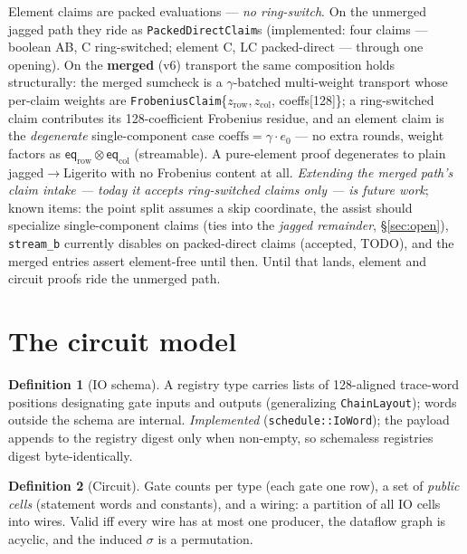 \documentclass[11pt]{article}
\newcommand{\eq}{\mathsf{eq}}
\newcommand{\code}[1]{\texttt{#1}}
\theoremstyle{definition}
\newtheorem{definition}{Definition}
\begin{document}
Element claims are packed evaluations --- \emph{no ring-switch}. On the
unmerged jagged path they ride as \code{PackedDirectClaim}s (implemented:
four claims --- boolean AB, C ring-switched; element C, LC packed-direct
--- through one opening). On the \textbf{merged} (v6) transport the same
composition holds structurally: the merged sumcheck is a $\gamma$-batched
multi-weight transport whose per-claim weights are
\code{FrobeniusClaim}\{$z_{\mathrm{row}}, z_{\mathrm{col}}$,
coeffs[128]\}; a ring-switched claim contributes its 128-coefficient
Frobenius residue, and an element claim is the \emph{degenerate}
single-component case $\mathrm{coeffs} = \gamma \cdot e_0$ --- no extra
rounds, weight factors as $\eq_{\mathrm{row}} \otimes \eq_{\mathrm{col}}$
(streamable). A pure-element proof degenerates to plain
jagged$\to$Ligerito with no Frobenius content at all. \emph{Extending the merged path's claim intake --- today it accepts
ring-switched claims only --- is future work}; known items: the point
split assumes a skip coordinate, the assist should specialize
single-component claims (ties into the \emph{jagged remainder},
\S\ref{sec:open}),
\code{stream\_b} currently disables on packed-direct claims (accepted,
TODO), and the merged entries assert element-free until then. Until that
lands, element and circuit proofs ride the unmerged path.

\section{The circuit model}\label{sec:cells}

\begin{definition}[IO schema]
A registry type carries lists of 128-aligned trace-word positions
designating gate inputs and outputs (generalizing \code{ChainLayout});
words outside the schema are internal. \emph{Implemented}
(\code{schedule::IoWord}); the payload appends to the registry digest only
when non-empty, so schemaless registries digest byte-identically.
\end{definition}

\begin{definition}[Circuit]
Gate counts per type (each gate one row), a set of \emph{public cells}
(statement words and constants), and a wiring: a partition of all IO cells
into wires. Valid iff every wire has at most one producer, the dataflow
graph is acyclic, and the induced $\sigma$ is a permutation.
\end{definition}
\end{document}
